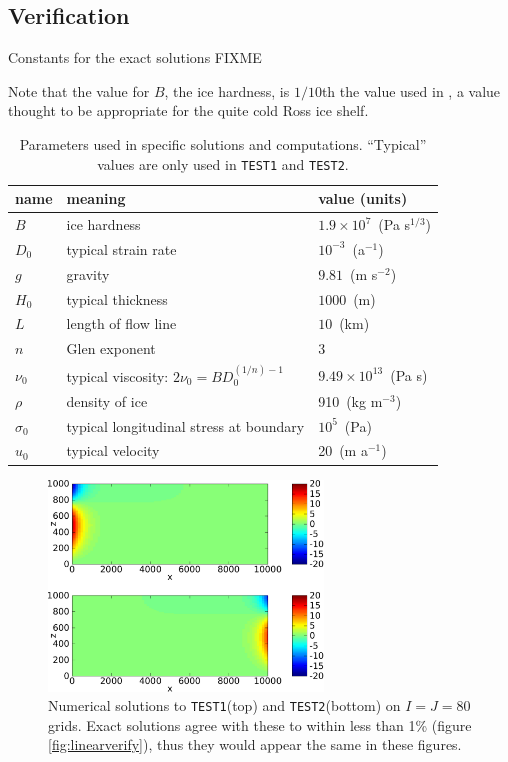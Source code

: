 \documentclass[11pt,final,reqno]{amsart}
\theoremstyle{remark}
\theoremstyle{definition}
\newcommand{\TESTONE}{\texttt{TEST1}\xspace}
\newcommand{\TESTTWO}{\texttt{TEST2}\xspace}
\begin{document}
\subsection*{Verification}  Constants for the exact solutions FIXME

Note that the value for $B$, the ice hardness, is $1/10$th the value used in \cite{MacAyealetal}, a value thought to be appropriate for the quite cold Ross ice shelf.

\begin{table}
\caption{Parameters used in specific solutions and computations. ``Typical'' values are only used in \TESTONE and \TESTTWO.}
\label{tab:notation}
\begin{tabular}{@{}lll}
name  & meaning  & value (units) \\ 
\hline
$B$\phantom{\huge h \normalsize}     & ice hardness              & $1.9 \times 10^7$ \,(Pa s$^{1/3}$) \\
$D_0$    & typical strain rate       & $10^{-3}$  \,(a$^{-1}$) \\
$g$      & gravity                   & $9.81$     \,(m s$^{-2}$) \\
$H_0$    & typical thickness         & $1000$     \,(m) \\
$L$      & length of flow line       & $10$       \,(km) \\
$n$      & Glen exponent             & 3          \\
$\nu_0$  & typical viscosity: $2 \nu_0 = B D_0^{(1/n)-1}$ & $9.49 \times 10^{13}$ \,(Pa s) \\
$\rho$   & density of ice            & 910        \,(kg m$^{-3}$) \\
$\sigma_0$ & typical longitudinal stress at boundary & $10^5$ \,(Pa) \\
$u_0$    & typical velocity          & 20         \,(m a$^{-1}$)
\end{tabular}
\end{table}


\begin{figure}[ht] 
\includegraphics[width=0.65\textwidth]{figs/showtests}
\caption{Numerical solutions to \TESTONE (top) and \TESTTWO (bottom) on $I=J=80$ grids.  Exact solutions agree with these to within less than 1\% (figure \ref{fig:linearverify}), thus they would appear the same in these figures.}
\label{fig:showtests}
\end{figure}
\end{document}
